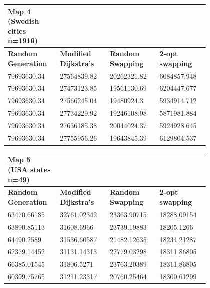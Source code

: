 \documentclass{article}
\begin{document}
\begin{table}[H]
    \centering
    \begin{tabular}{|p{0.2\linewidth}|p{0.2\linewidth}|p{0.2\linewidth}|p{0.2\linewidth}|}
    \hline
        \textbf{Map 4 (Swedish cities n=1916)} & ~ & ~ & ~ \\ \hline
        \textbf{Random Generation} & \textbf{Modified Dijkstra's} & \textbf{Random Swapping} & \textbf{2-opt swapping} \\ \hline
        79693630.34 & 27564839.82 & 20262321.82 & 6084857.948 \\ \hline
        79693630.34 & 27473123.85 & 19561130.69 & 6204447.677 \\ \hline
        79693630.34 & 27566245.04 & 19480924.3 & 5934914.712 \\ \hline
        79693630.34 & 27734229.92 & 19246108.98 & 5871981.884 \\ \hline
        79693630.34 & 27636185.38 & 20044024.37 & 5924928.645 \\ \hline
        79693630.34 & 27755956.26 & 19643845.39 & 6129804.537 \\ \hline
    \end{tabular}
\end{table}

\begin{table}[H]
    \centering
    \begin{tabular}{|p{0.2\linewidth}|p{0.2\linewidth}|p{0.2\linewidth}|p{0.2\linewidth}|}
    \hline
        \textbf{Map 5 (USA states n=49)} & ~ & ~ & ~ \\ \hline
        \textbf{Random Generation} & \textbf{Modified Dijkstra's} & \textbf{Random Swapping} & \textbf{2-opt swapping} \\ \hline
        63470.66185 & 32761.02342 & 23363.90715 & 18288.09154 \\ \hline
        63890.85113 & 31608.6966 & 23739.19883 & 18205.1266 \\ \hline
        64490.2589 & 31536.60587 & 21482.12635 & 18234.21287 \\ \hline
        62379.14452 & 31131.14313 & 22779.03298 & 18311.86805 \\ \hline
        66385.01545 & 31806.5271 & 23763.20389 & 18311.86805 \\ \hline
        60399.75765 & 31211.23317 & 20760.25464 & 18300.61299 \\ \hline
     \end{tabular}
\end{table}
\end{document}
